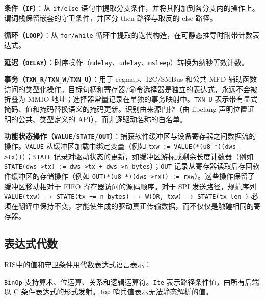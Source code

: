 \documentclass[sigplan, screen, review, anonymous]{acmart}
\newcommand{\rislang}{RIS}
\begin{document}
\textbf{条件（\texttt{IF}）}：从 \texttt{if/else} 语句中提取分支条件，并将其附加到各分支内的操作上。谓词栈保留嵌套的守卫条件，并区分 then 路径与取反的 else 路径。

\textbf{循环（\texttt{LOOP}）}：从 \texttt{for/while} 循环中提取的迭代构造，在可静态推导时附带计数表达式。

\textbf{延迟（\texttt{DELAY}）}：时序操作（\texttt{mdelay}、\texttt{udelay}、\texttt{msleep}）转换为纳秒等效计数。

\textbf{事务（\texttt{TXN\_R}/\texttt{TXN\_W}/\texttt{TXN\_U}）}：用于 regmap、I2C/SMBus 和公共 MFD 辅助函数访问的类型化操作。目标句柄和寄存器/命令选择器是独立的表达式，永远不会被折叠为 MMIO 地址；选择器常量记录在单独的事务映射中。\texttt{TXN\_U} 表示带有显式掩码、值和掩码替换语义的掩码更新。识别由来源门控（由 libclang 声明位置证明的公共、类型定义的 API），而非逐驱动名称的白名单。

\textbf{功能状态操作（\texttt{VALUE}/\texttt{STATE}/\texttt{OUT}）}：捕获软件缓冲区与设备寄存器之间数据流的操作。\texttt{VALUE} 从缓冲区加载中绑定变量（例如 \texttt{txw := VALUE(*(u8 *)(dws->tx))}）；\texttt{STATE} 记录对驱动状态的更新，如缓冲区游标或剩余长度计数器（例如 \texttt{STATE(dws->tx) := dws->tx + dws->n\_bytes}）；\texttt{OUT} 记录从寄存器读取后存回软件缓冲区的存储操作（例如 \texttt{OUT(*(u8 *)(dws->rx)) := rxw}）。这些操作保留了缓冲区移动相对于 FIFO 寄存器访问的源码顺序。对于 SPI 发送路径，规范序列 \texttt{VALUE(txw)} $\rightarrow$ \texttt{STATE(tx += n\_bytes)} $\rightarrow$ \texttt{W(DR, txw)} $\rightarrow$ \texttt{STATE(tx\_len--)} 必须在翻译中保持不变，才能使生成的驱动真正传输数据，而不仅仅是触碰相同的寄存器。

\subsection{表达式代数}

\rislang 中的值和守卫条件用代数表达式语言表示：

\begin{center}
\end{center}

\texttt{BinOp} 支持算术、位运算、关系和逻辑运算符。\texttt{Ite} 表示路径条件值，由所有后端以 C 条件表达式的形式发射。\texttt{Top} 哨兵值表示无法静态解析的值。
\end{document}
